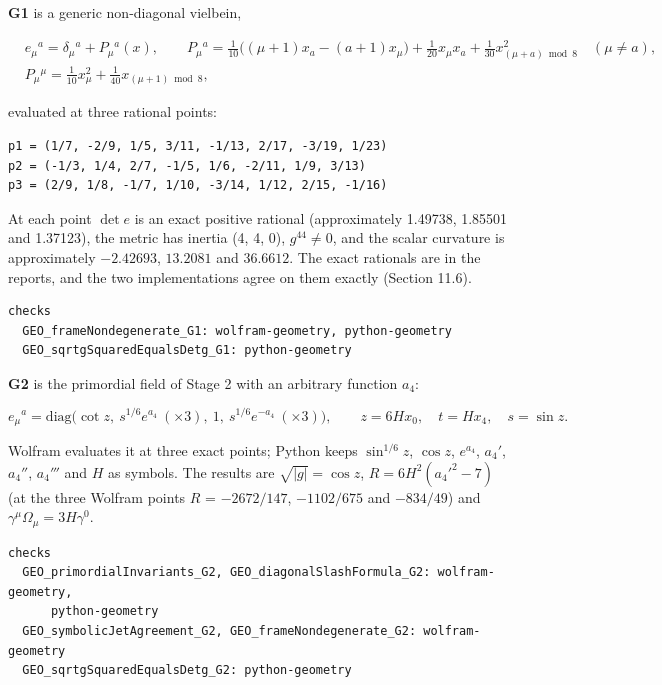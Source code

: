 \documentclass[11pt]{article}
\begin{document}
\textbf{G1} is a generic non-diagonal vielbein,

\[
\begin{aligned}
&e_\mu{}^a=\delta_\mu{}^a+P_\mu{}^a(x),\qquad P_\mu{}^a=\tfrac1{10}\bigl((\mu+1)x_a-(a+1)x_\mu\bigr)+\tfrac1{20}x_\mu x_a+\tfrac1{30}x_{(\mu+a)\bmod8}^2\quad(\mu\ne a),\\
&P_\mu{}^\mu=\tfrac1{10}x_\mu^2+\tfrac1{40}x_{(\mu+1)\bmod8},
\end{aligned}
\]

evaluated at three rational points:

\begin{Verbatim}[fontsize=\small]
p1 = (1/7, -2/9, 1/5, 3/11, -1/13, 2/17, -3/19, 1/23)
p2 = (-1/3, 1/4, 2/7, -1/5, 1/6, -2/11, 1/9, 3/13)
p3 = (2/9, 1/8, -1/7, 1/10, -3/14, 1/12, 2/15, -1/16)
\end{Verbatim}

At each point $\det e$ is an exact positive rational (approximately 1.49738, 1.85501 and 1.37123), the metric has inertia (4, 4, 0), $g^{44}\ne0$, and the scalar curvature is approximately $-2.42693$, $13.2081$ and $36.6612$. The exact rationals are in the reports, and the two implementations agree on them exactly (Section 11.6).

\begin{Verbatim}[fontsize=\small]
checks
  GEO_frameNondegenerate_G1: wolfram-geometry, python-geometry
  GEO_sqrtgSquaredEqualsDetg_G1: python-geometry
\end{Verbatim}

\textbf{G2} is the primordial field of Stage 2 with an arbitrary function $a_4$:

\[
e_\mu{}^a=\mathrm{diag}\bigl(\cot z,\ s^{1/6}e^{a_4}\ (\times3),\ 1,\ s^{1/6}e^{-a_4}\ (\times3)\bigr),\qquad z=6Hx_0,\quad t=Hx_4,\quad s=\sin z .
\]

Wolfram evaluates it at three exact points; Python keeps $\sin^{1/6}z$, $\cos z$, $e^{a_4}$, $a_4'$, $a_4''$, $a_4'''$ and $H$ as symbols. The results are $\sqrt{|g|}=\cos z$, $R=6H^2(a_4'^2-7)$ (at the three Wolfram points $R$ = $-2672/147$, $-1102/675$ and $-834/49$) and $\gamma^\mu\Omega_\mu=3H\gamma^0$.

\begin{Verbatim}[fontsize=\small]
checks
  GEO_primordialInvariants_G2, GEO_diagonalSlashFormula_G2: wolfram-geometry,
      python-geometry
  GEO_symbolicJetAgreement_G2, GEO_frameNondegenerate_G2: wolfram-geometry
  GEO_sqrtgSquaredEqualsDetg_G2: python-geometry
\end{Verbatim}
\end{document}

